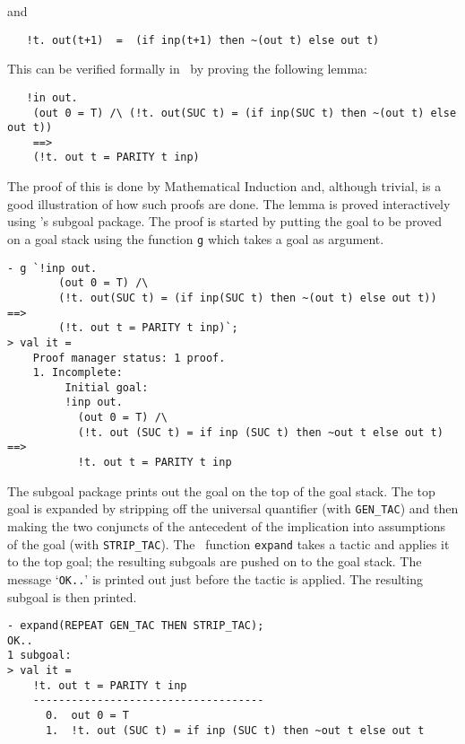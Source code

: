 \noindent and

{\small\baselineskip\HOLSpacing\begin{verbatim}
   !t. out(t+1)  =  (if inp(t+1) then ~(out t) else out t)
\end{verbatim}}

\noindent This can be verified formally in \HOL\ by proving the
following lemma:

{\small\baselineskip\HOLSpacing\begin{verbatim}
   !in out.
    (out 0 = T) /\ (!t. out(SUC t) = (if inp(SUC t) then ~(out t) else out t))
    ==>
    (!t. out t = PARITY t inp)
\end{verbatim}}

\noindent The proof of this is done by Mathematical Induction and, although
trivial, is a good illustration of how such proofs are done.  The
lemma is proved interactively using \HOL's subgoal package.  The proof
is started by putting the goal to be proved on a goal stack using the
function {\small\verb|g|} which takes a goal as argument.

\begin{session}
\begin{verbatim}
- g `!inp out.
        (out 0 = T) /\
        (!t. out(SUC t) = (if inp(SUC t) then ~(out t) else out t)) ==>
        (!t. out t = PARITY t inp)`;
> val it =
    Proof manager status: 1 proof.
    1. Incomplete:
         Initial goal:
         !inp out.
           (out 0 = T) /\
           (!t. out (SUC t) = if inp (SUC t) then ~out t else out t) ==>
           !t. out t = PARITY t inp
\end{verbatim}
\end{session}

\noindent The subgoal package prints out the goal on the top of the goal stack.
The top goal is expanded by stripping off the universal quantifier
(with {\small\verb|GEN_TAC|}) and then making the two conjuncts of the
antecedent of the implication into assumptions of the goal (with
{\small\verb|STRIP_TAC|}).  The \ML\ function {\small\verb|expand|}
takes a tactic and applies it to the top goal; the resulting subgoals
are pushed on to the goal stack.  The message `{\small\verb|OK..|}' is
printed out just before the tactic is applied.  The resulting subgoal
is then printed.


\begin{session}
\begin{verbatim}
- expand(REPEAT GEN_TAC THEN STRIP_TAC);
OK..
1 subgoal:
> val it =
    !t. out t = PARITY t inp
    ------------------------------------
      0.  out 0 = T
      1.  !t. out (SUC t) = if inp (SUC t) then ~out t else out t
\end{verbatim}
\end{session}

